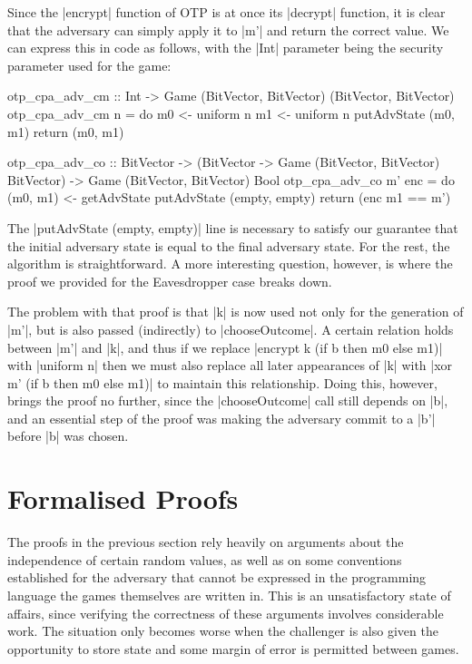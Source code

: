 Since the |encrypt| function of OTP is at once its |decrypt| function, it is clear that the adversary can simply apply
it to |m'| and return the correct value.  We can express this in code as follows, with the |Int| parameter being the
security parameter used for the game:
\begin{code}
    otp_cpa_adv_cm :: Int -> Game (BitVector, BitVector) (BitVector, BitVector)
    otp_cpa_adv_cm n = do
        m0 <- uniform n
        m1 <- uniform n
        putAdvState (m0, m1)
        return (m0, m1)

    otp_cpa_adv_co :: BitVector
                   -> (BitVector -> Game (BitVector, BitVector) BitVector)
                   -> Game (BitVector, BitVector) Bool
    otp_cpa_adv_co m' enc = do
        (m0, m1) <- getAdvState
        putAdvState (empty, empty)
        return (enc m1 == m')
\end{code}

The |putAdvState (empty, empty)| line is necessary to satisfy our guarantee that the initial adversary state is equal to
the final adversary state.  For the rest, the algorithm is straightforward.  A more interesting question, however, is
where the proof we provided for the Eavesdropper case breaks down.

The problem with that proof is that |k| is now used not only for the generation of |m'|, but is also passed (indirectly)
to |chooseOutcome|.  A certain relation holds between |m'| and |k|, and thus if we replace |encrypt k (if b then m0 else
m1)| with |uniform n| then we must also replace all later appearances of |k| with |xor m' (if b then m0 else m1)| to
maintain this relationship.  Doing this, however, brings the proof no further, since the |chooseOutcome| call still
depends on |b|, and an essential step of the proof was making the adversary commit to a |b'| before |b| was chosen.

\section{Formalised Proofs}

The proofs in the previous section rely heavily on arguments about the independence of certain random values, as well as
on some conventions established for the adversary that cannot be expressed in the programming language the games
themselves are written in.  This is an unsatisfactory state of affairs, since verifying the correctness of these
arguments involves considerable work.  The situation only becomes worse when the challenger is also given the
opportunity to store state and some margin of error is permitted between games.

